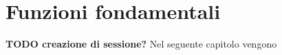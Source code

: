 \documentclass[crop=false, class=book]{standalone}
\begin{document}
	\chapter{Funzioni fondamentali}
	\textbf{TODO creazione di sessione?}
	Nel seguente capitolo vengono 
	
	 
\end{document}

